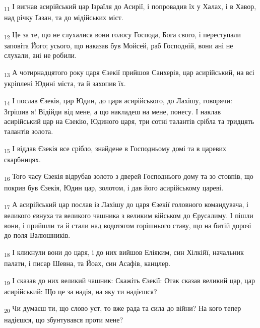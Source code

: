 \begin{tcolorbox}
\textsubscript{11} І вигнав асирійський цар Ізраїля до Асирії, і попровадив їх у Халах, і в Хавор, над річку Ґазан, та до мідійських міст.
\end{tcolorbox}
\begin{tcolorbox}
\textsubscript{12} Це за те, що не слухалися вони голосу Господа, Бога свого, і переступали заповіта Його; усього, що наказав був Мойсей, раб Господній, вони ані не слухали, ані не робили.
\end{tcolorbox}
\begin{tcolorbox}
\textsubscript{13} А чотирнадцятого року царя Єзекії прийшов Санхерів, цар асирійський, на всі укріплені Юдині міста, та й захопив їх.
\end{tcolorbox}
\begin{tcolorbox}
\textsubscript{14} І послав Єзекія, цар Юдин, до царя асирійського, до Лахішу, говорячи: Згрішив я! Відійди від мене, а що накладеш на мене, понесу. І наклав асирійський цар на Єзекію, Юдиного царя, три сотні талантів срібла та тридцять талантів золота.
\end{tcolorbox}
\begin{tcolorbox}
\textsubscript{15} І віддав Єзекія все срібло, знайдене в Господньому домі та в царевих скарбницях.
\end{tcolorbox}
\begin{tcolorbox}
\textsubscript{16} Того часу Єзекія відрубав золото з дверей Господнього дому та зо стовпів, що покрив був Єзекія, Юдин цар, золотом, і дав його асирійському цареві.
\end{tcolorbox}
\begin{tcolorbox}
\textsubscript{17} А асирійський цар послав із Лахішу до царя Єзекії головного командувача, і великого євнуха та великого чашника з великим військом до Єрусалиму. І пішли вони, і прийшли та й стали над водотягом горішнього ставу, що на битій дорозі до поля Валюшників.
\end{tcolorbox}
\begin{tcolorbox}
\textsubscript{18} І кликнули вони до царя, і до них вийшов Еліяким, син Хілкійї, начальник палати, і писар Шевна, та Йоах, син Асафів, канцлер.
\end{tcolorbox}
\begin{tcolorbox}
\textsubscript{19} І сказав до них великий чашник: Скажіть Єзекії: Отак сказав великий цар, цар асирійський: Що це за надія, на яку ти надієшся?
\end{tcolorbox}
\begin{tcolorbox}
\textsubscript{20} Чи думаєш ти, що слово уст, то вже рада та сила до війни? На кого тепер надієшся, що збунтувався проти мене?
\end{tcolorbox}
